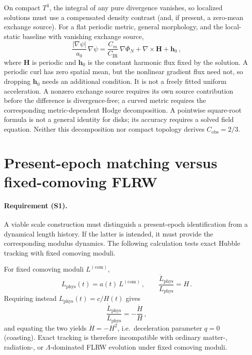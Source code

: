 \documentclass[aps,prd,reprint,superscriptaddress,nofootinbib,floatfix,showkeys]{revtex4-2}
\newcommand{\Tthree}{T^{3}}
\newcommand{\Cobs}{C_{\mathrm{obs}}}
\newcommand{\Cm}{C_{m}}
\newcommand{\CIR}{C_{\mathrm{IR}}}
\newcommand{\azero}{a_{0}}
\begin{document}
On compact \(\Tthree\), the integral of any pure divergence vanishes, so
localized solutions must use a compensated density contrast (and, if present,
a zero-mean exchange source).  For a flat periodic metric, general morphology,
and the local-static baseline with vanishing exchange source,
\begin{equation}
  \frac{|\nabla\psi|}{\azero}\,\nabla\psi
  = \frac{\Cm}{\CIR}\,\nabla\Phi_{N} + \nabla\times\mathbf{H}
    + \mathbf{h}_0\,,
  \label{eq:curl}
\end{equation}
where \(\mathbf H\) is periodic and \(\mathbf h_0\) is the constant harmonic
flux fixed by the solution.  A periodic curl has zero spatial mean, but the
nonlinear gradient flux need not, so dropping \(\mathbf h_0\) needs an
additional condition.  It is not a freely fitted uniform acceleration.
A nonzero exchange source requires its own source contribution before the
difference is divergence-free; a curved metric requires the corresponding
metric-dependent Hodge decomposition. A pointwise square-root formula is not
a general identity for disks; its accuracy requires a solved field equation.
Neither this decomposition nor compact topology
derives \(\Cobs=2/3\).

\section{Present-epoch matching versus fixed-comoving FLRW}
\label{sec:dynamic}

\paragraph{Requirement (S1).}
A viable scale construction must distinguish a present-epoch identification
from a dynamical length history.  If the latter is intended, it must provide
the corresponding modulus dynamics.  The following calculation tests exact
Hubble tracking with fixed comoving moduli.

For fixed comoving moduli \(L^{\mathrm{(com)}}\),
\begin{equation}
  L_{\mathrm{phys}}(t)=a(t)\,L^{\mathrm{(com)}}\,,
  \qquad
  \frac{\dot L_{\mathrm{phys}}}{L_{\mathrm{phys}}}=H\,.
  \label{eq:fixed}
\end{equation}
Requiring instead \(L_{\mathrm{phys}}(t)=c/H(t)\) gives
\begin{equation}
  \frac{\dot L_{\mathrm{phys}}}{L_{\mathrm{phys}}}
  = -\frac{\dot H}{H}\,,
  \label{eq:dsm-rate}
\end{equation}
and equating the two yields \(\dot H=-H^{2}\), i.e.\ deceleration parameter
\(q=0\) (coasting).  Exact tracking is therefore incompatible with ordinary
matter-, radiation-, or \(\Lambda\)-dominated FLRW evolution under fixed
comoving moduli.
\end{document}
